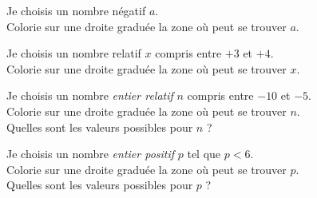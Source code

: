 \begin{myenumerate}
  \item Je choisis un nombre négatif $a$.\\Colorie sur une droite graduée la \og{}zone\fg{} où peut se trouver $a$.
  \item Je choisis un nombre relatif $x$ compris entre $+3$ et $+4$.\\Colorie sur une droite graduée la \og{}zone\fg{} où peut se trouver $x$.
  \item Je choisis un nombre {\em entier relatif} $n$ compris entre $-10$ et $-5$.\\Colorie sur une droite graduée la \og{}zone\fg{} où peut se trouver $n$.\\Quelles sont les valeurs possibles pour $n$ ?
  \item Je choisis un nombre {\em entier positif} $p$ tel que $p<6$.\\Colorie sur une droite graduée la \og{}zone\fg{} où peut se trouver $p$.\\Quelles sont les valeurs possibles pour $p$ ?
\end{myenumerate}